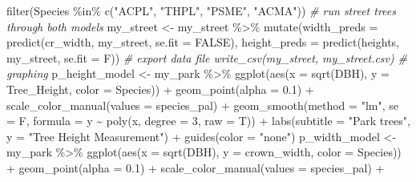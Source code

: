 \documentclass[12pt,twoside]{reedthesis}
\newenvironment{Shaded}{\begin{snugshade}}{\end{snugshade}}
\newcommand{\AttributeTok}[1]{\textcolor[rgb]{0.77,0.63,0.00}{#1}}
\newcommand{\CommentTok}[1]{\textcolor[rgb]{0.56,0.35,0.01}{\textit{#1}}}
\newcommand{\ConstantTok}[1]{\textcolor[rgb]{0.00,0.00,0.00}{#1}}
\newcommand{\DecValTok}[1]{\textcolor[rgb]{0.00,0.00,0.81}{#1}}
\newcommand{\FloatTok}[1]{\textcolor[rgb]{0.00,0.00,0.81}{#1}}
\newcommand{\FunctionTok}[1]{\textcolor[rgb]{0.00,0.00,0.00}{#1}}
\newcommand{\NormalTok}[1]{#1}
\newcommand{\OtherTok}[1]{\textcolor[rgb]{0.56,0.35,0.01}{#1}}
\newcommand{\SpecialCharTok}[1]{\textcolor[rgb]{0.00,0.00,0.00}{#1}}
\newcommand{\StringTok}[1]{\textcolor[rgb]{0.31,0.60,0.02}{#1}}
\begin{document}
\begin{Shaded}
\begin{Highlighting}[]
    \FunctionTok{filter}\NormalTok{(Species }\SpecialCharTok{\%in\%} \FunctionTok{c}\NormalTok{(}\StringTok{"ACPL"}\NormalTok{, }\StringTok{"THPL"}\NormalTok{, }\StringTok{"PSME"}\NormalTok{, }\StringTok{"ACMA"}\NormalTok{))}
\CommentTok{\# run street trees through both models}
\NormalTok{my\_street }\OtherTok{\textless{}{-}}\NormalTok{ my\_street }\SpecialCharTok{\%\textgreater{}\%}
    \FunctionTok{mutate}\NormalTok{(}\AttributeTok{width\_preds =} \FunctionTok{predict}\NormalTok{(cr\_width, my\_street, }\AttributeTok{se.fit =} \ConstantTok{FALSE}\NormalTok{),}
        \AttributeTok{height\_preds =} \FunctionTok{predict}\NormalTok{(heights, my\_street, }\AttributeTok{se.fit =}\NormalTok{ F))}
\CommentTok{\# export data file write\_csv(my\_street, \textquotesingle{}my\_street.csv\textquotesingle{})}
\CommentTok{\# graphing}
\NormalTok{p\_height\_model }\OtherTok{\textless{}{-}}\NormalTok{ my\_park }\SpecialCharTok{\%\textgreater{}\%}
    \FunctionTok{ggplot}\NormalTok{(}\FunctionTok{aes}\NormalTok{(}\AttributeTok{x =} \FunctionTok{sqrt}\NormalTok{(DBH), }\AttributeTok{y =}\NormalTok{ Tree\_Height, }\AttributeTok{color =}\NormalTok{ Species)) }\SpecialCharTok{+}
    \FunctionTok{geom\_point}\NormalTok{(}\AttributeTok{alpha =} \FloatTok{0.1}\NormalTok{) }\SpecialCharTok{+} \FunctionTok{scale\_color\_manual}\NormalTok{(}\AttributeTok{values =}\NormalTok{ species\_pal) }\SpecialCharTok{+}
    \FunctionTok{geom\_smooth}\NormalTok{(}\AttributeTok{method =} \StringTok{"lm"}\NormalTok{, }\AttributeTok{se =}\NormalTok{ F, }\AttributeTok{formula =}\NormalTok{ y }\SpecialCharTok{\textasciitilde{}} \FunctionTok{poly}\NormalTok{(x,}
        \AttributeTok{degree =} \DecValTok{3}\NormalTok{, }\AttributeTok{raw =}\NormalTok{ T)) }\SpecialCharTok{+} \FunctionTok{labs}\NormalTok{(}\AttributeTok{subtitle =} \StringTok{"Park trees"}\NormalTok{,}
    \AttributeTok{y =} \StringTok{"Tree Height Measurement"}\NormalTok{) }\SpecialCharTok{+} \FunctionTok{guides}\NormalTok{(}\AttributeTok{color =} \StringTok{"none"}\NormalTok{)}
\NormalTok{p\_width\_model }\OtherTok{\textless{}{-}}\NormalTok{ my\_park }\SpecialCharTok{\%\textgreater{}\%}
    \FunctionTok{ggplot}\NormalTok{(}\FunctionTok{aes}\NormalTok{(}\AttributeTok{x =} \FunctionTok{sqrt}\NormalTok{(DBH), }\AttributeTok{y =}\NormalTok{ crown\_width, }\AttributeTok{color =}\NormalTok{ Species)) }\SpecialCharTok{+}
    \FunctionTok{geom\_point}\NormalTok{(}\AttributeTok{alpha =} \FloatTok{0.1}\NormalTok{) }\SpecialCharTok{+} \FunctionTok{scale\_color\_manual}\NormalTok{(}\AttributeTok{values =}\NormalTok{ species\_pal) }\SpecialCharTok{+}

\end{Highlighting}
\end{Shaded}
\end{document}
